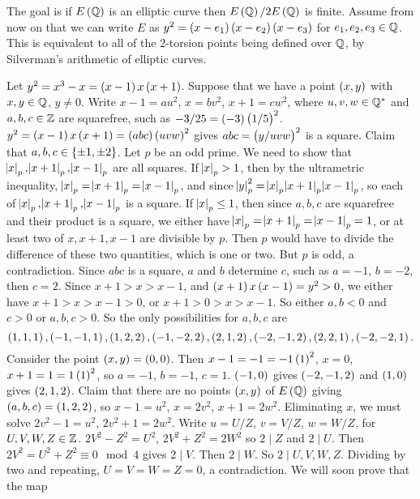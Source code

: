 
The goal is if $ E\br{\Q} $ is an elliptic curve then $ E\br{\Q} / 2E\br{\Q} $ is finite. Assume from now on that we can write $ E $ as $ y^2 = \br{x - e_1}\br{x - e_2}\br{x - e_3} $ for $ e_1, e_2, e_3 \in \mathbb{Q} $. This is equivalent to all of the $ 2 $-torsion points being defined over $ \mathbb{Q} $, by Silverman's arithmetic of elliptic curves.

\begin{example*}
Let $ y^2 = x^3 - x = \br{x - 1}x\br{x + 1} $. Suppose that we have a point $ \br{x, y} $ with $ x, y \in \mathbb{Q} $, $ y \ne 0 $. Write $ x - 1 = au^2 $, $ x = bv^2 $, $ x + 1 = cw^2 $, where $ u, v, w \in \mathbb{Q}^* $ and $ a, b, c \in \mathbb{Z} $ are squarefree, such as $ -3 / 25 = \br{-3}\br{1 / 5}^2 $. $ y^2 = \br{x - 1}x\br{x + 1} = \br{abc}\br{uvw}^2 $ gives $ abc = \br{y / uvw}^2 $ is a square. Claim that $ a, b, c \in \cbr{\pm 1, \pm 2} $. Let $ p $ be an odd prime. We need to show that $ \abs{x}_p, \abs{x + 1}_p, \abs{x - 1}_p $ are all squares. If $ \abs{x}_p > 1 $, then by the ultrametric inequality, $ \abs{x}_p = \abs{x + 1}_p = \abs{x - 1}_p $, and since $ \abs{y}_p^2 = \abs{x}_p\abs{x + 1}_p\abs{x - 1}_p $, so each of $ \abs{x}_p, \abs{x + 1}_p, \abs{x - 1}_p $ is a square. If $ \abs{x}_p \le 1 $, then since $ a, b, c $ are squarefree and their product is a square, we either have $ \abs{x}_p = \abs{x + 1}_p = \abs{x - 1}_p = 1 $, or at least two of $ x, x + 1, x - 1 $ are divisible by $ p $. Then $ p $ would have to divide the difference of these two quantities, which is one or two. But $ p $ is odd, a contradiction. Since $ abc $ is a square, $ a $ and $ b $ determine $ c $, such as $ a = -1 $, $ b = -2 $, then $ c = 2 $. Since $ x + 1 > x > x - 1 $, and $ \br{x + 1}x\br{x - 1} = y^2 > 0 $, we either have $ x + 1 > x > x - 1 > 0 $, or $ x + 1 > 0 > x > x - 1 $. So either $ a, b < 0 $ and $ c > 0 $ or $ a, b, c > 0 $. So the only possibilities for $ a, b, c $ are
$$ \br{1, 1, 1}, \br{-1, -1, 1}, \br{1, 2, 2}, \br{-1, -2, 2}, \br{2, 1, 2}, \br{-2, -1, 2}, \br{2, 2, 1}, \br{-2, -2, 1}. $$
Consider the point $ \br{x, y} = \br{0, 0} $. Then $ x - 1 = -1 = -1\br{1}^2 $, $ x = 0 $, $ x + 1 = 1 = 1\br{1}^2 $, so $ a = -1 $, $ b = -1 $, $ c = 1 $. $ \br{-1, 0} $ gives $ \br{-2, -1, 2} $ and $ \br{1, 0} $ gives $ \br{2, 1, 2} $. Claim that there are no points $ \br{x, y} $ of $ E\br{\Q} $ giving $ \br{a, b, c} = \br{1, 2, 2} $, so $ x - 1 = u^2 $, $ x = 2v^2 $, $ x + 1 = 2w^2 $. Eliminating $ x $, we must solve $ 2v^2 - 1 = u^2 $, $ 2v^2 + 1 = 2w^2 $. Write $ u = U / Z $, $ v = V / Z $, $ w = W / Z $, for $ U, V, W, Z \in \mathbb{Z} $. $ 2V^2 - Z^2 = U^2 $, $ 2V^2 + Z^2 = 2W^2 $ so $ 2 \mid Z $ and $ 2 \mid U $. Then $ 2V^2 = U^2 + Z^2 \equiv 0 \mod 4 $ gives $ 2 \mid V $. Then $ 2 \mid W $. So $ 2 \mid U, V, W, Z $. Dividing by two and repeating, $ U = V = W = Z = 0 $, a contradiction. We will soon prove that the map

\end{example*}
